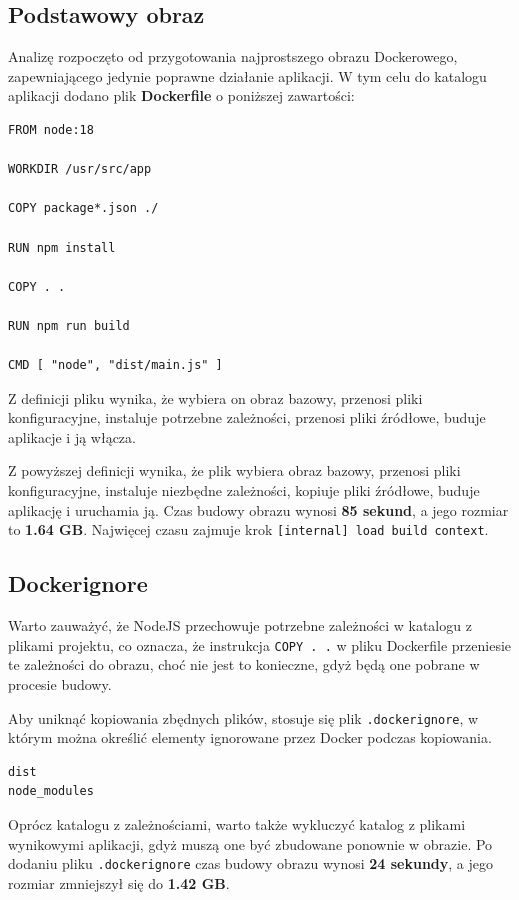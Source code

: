 \documentclass{article}
\begin{document}
\subsection{Podstawowy obraz}

Analizę rozpoczęto od przygotowania najprostszego obrazu Dockerowego, zapewniającego jedynie poprawne działanie aplikacji. W tym celu do katalogu aplikacji dodano plik \textbf{Dockerfile} o poniższej zawartości:

\begin{lstlisting}[caption=Podstawowy plik Dockerfile]
FROM node:18

WORKDIR /usr/src/app

COPY package*.json ./

RUN npm install

COPY . .

RUN npm run build

CMD [ "node", "dist/main.js" ]
\end{lstlisting}

Z definicji pliku wynika, że wybiera on obraz bazowy, przenosi pliki konfiguracyjne, instaluje potrzebne zależności, przenosi pliki źródłowe, buduje aplikacje i ją włącza.

Z powyższej definicji wynika, że plik wybiera obraz bazowy, przenosi pliki konfiguracyjne, instaluje niezbędne zależności, kopiuje pliki źródłowe, buduje aplikację i uruchamia ją. Czas budowy obrazu wynosi \textbf{85 sekund}, a jego rozmiar to \textbf{1.64 GB}. Najwięcej czasu zajmuje krok \lstinline|[internal] load build context|.

\subsection{Dockerignore}

Warto zauważyć, że NodeJS przechowuje potrzebne zależności w katalogu z plikami projektu, co oznacza, że instrukcja \lstinline|COPY . .| w pliku Dockerfile przeniesie te zależności do obrazu, choć nie jest to konieczne, gdyż będą one pobrane w procesie budowy.

Aby uniknąć kopiowania zbędnych plików, stosuje się plik \lstinline|.dockerignore|, w którym można określić elementy ignorowane przez Docker podczas kopiowania.

\begin{lstlisting}[caption=Plik .dockerignore]
dist
node_modules
\end{lstlisting}

Oprócz katalogu z zależnościami, warto także wykluczyć katalog z plikami wynikowymi aplikacji, gdyż muszą one być zbudowane ponownie w obrazie. Po dodaniu pliku \lstinline|.dockerignore| czas budowy obrazu wynosi \textbf{24 sekundy}, a jego rozmiar zmniejszył się do \textbf{1.42 GB}.
\end{document}
